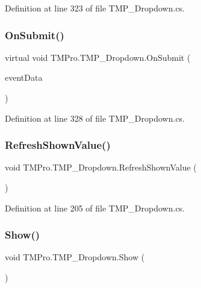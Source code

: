 Definition at line 323 of file T\+M\+P\+\_\+\+Dropdown.\+cs.

\mbox{\label{class_t_m_pro_1_1_t_m_p___dropdown_a258ceecac06f7f153c9a3569a817d74f}} 
\subsubsection{\texorpdfstring{OnSubmit()}{OnSubmit()}}
{\footnotesize\ttfamily virtual void T\+M\+Pro.\+T\+M\+P\+\_\+\+Dropdown.\+On\+Submit (\begin{DoxyParamCaption}\item[{Base\+Event\+Data}]{event\+Data }\end{DoxyParamCaption})\hspace{0.3cm}{\ttfamily [virtual]}}



Definition at line 328 of file T\+M\+P\+\_\+\+Dropdown.\+cs.

\mbox{\label{class_t_m_pro_1_1_t_m_p___dropdown_ac99e89e4f86608cd77442d20b9de3aba}} 
\subsubsection{\texorpdfstring{RefreshShownValue()}{RefreshShownValue()}}
{\footnotesize\ttfamily void T\+M\+Pro.\+T\+M\+P\+\_\+\+Dropdown.\+Refresh\+Shown\+Value (\begin{DoxyParamCaption}{ }\end{DoxyParamCaption})}



Definition at line 205 of file T\+M\+P\+\_\+\+Dropdown.\+cs.

\mbox{\label{class_t_m_pro_1_1_t_m_p___dropdown_ae309311315603a4869384e1591842a73}} 
\subsubsection{\texorpdfstring{Show()}{Show()}}
{\footnotesize\ttfamily void T\+M\+Pro.\+T\+M\+P\+\_\+\+Dropdown.\+Show (\begin{DoxyParamCaption}{ }\end{DoxyParamCaption})}



